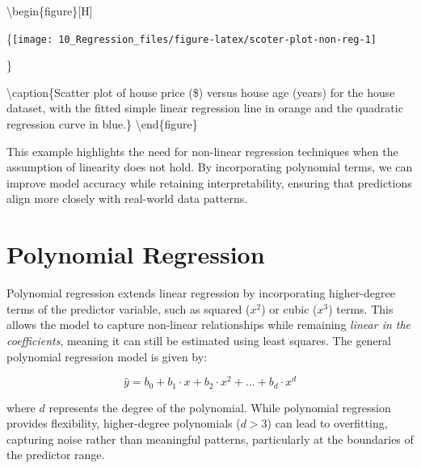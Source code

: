\documentclass[
  11pt,
]{book}
\theoremstyle{definition}
\theoremstyle{definition}
\theoremstyle{definition}
\theoremstyle{definition}
\theoremstyle{remark}
\begin{document}
\textbackslash begin\{figure\}{[}H{]}

\{\centering \texttt{[image: 10\_Regression\_files/figure-latex/scoter-plot-non-reg-1]}

\}

\textbackslash caption\{Scatter plot of house price (\$) versus house age (years) for the house dataset, with the fitted simple linear regression line in orange and the quadratic regression curve in blue.\}\label{fig:scoter-plot-non-reg}
\textbackslash end\{figure\}

This example highlights the need for non-linear regression techniques when the assumption of linearity does not hold. By incorporating polynomial terms, we can improve model accuracy while retaining interpretability, ensuring that predictions align more closely with real-world data patterns.

\section{Polynomial Regression}\label{polynomial-regression}

Polynomial regression extends linear regression by incorporating higher-degree terms of the predictor variable, such as squared (\(x^2\)) or cubic (\(x^3\)) terms. This allows the model to capture non-linear relationships while remaining \emph{linear in the coefficients}, meaning it can still be estimated using least squares. The general polynomial regression model is given by:

\[
\hat{y} = b_0 + b_1 \cdot x + b_2 \cdot x^2 + \dots + b_d \cdot x^d
\]

where \(d\) represents the degree of the polynomial. While polynomial regression provides flexibility, higher-degree polynomials (\(d > 3\)) can lead to overfitting, capturing noise rather than meaningful patterns, particularly at the boundaries of the predictor range.
\end{document}

